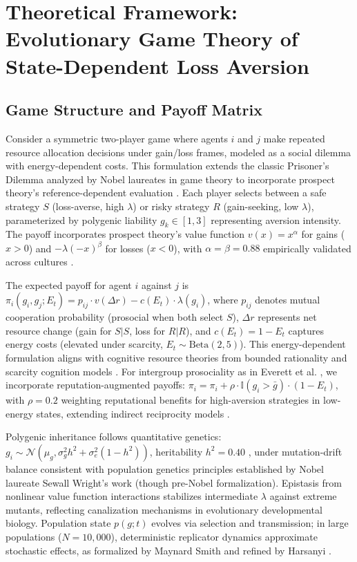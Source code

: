 \documentclass[11pt,twocolumn]{article}
\begin{document}
\section{Theoretical Framework: Evolutionary Game Theory of State-Dependent Loss Aversion}

\subsection{Game Structure and Payoff Matrix}

Consider a symmetric two-player game where agents $i$ and $j$ make repeated resource allocation decisions under gain/loss frames, modeled as a social dilemma with energy-dependent costs. This formulation extends the classic Prisoner's Dilemma analyzed by Nobel laureates in game theory \citep{axelrod1984,aumann2003} to incorporate prospect theory's reference-dependent evaluation \citep{kahneman1979,tversky1992}. Each player selects between a safe strategy $S$ (loss-averse, high $\lambda$) or risky strategy $R$ (gain-seeking, low $\lambda$), parameterized by polygenic liability $g_k \in [1, 3]$ representing aversion intensity. The payoff incorporates prospect theory's value function $v(x) = x^\alpha$ for gains ($x>0$) and $-\lambda (-x)^\beta$ for losses ($x<0$), with $\alpha=\beta=0.88$ empirically validated across cultures \citep{tversky1992,ruggeri2020}.

The expected payoff for agent $i$ against $j$ is $\pi_i(g_i, g_j; E_t) = p_{ij} \cdot v(\Delta r) - c(E_t) \cdot \lambda(g_i)$, where $p_{ij}$ denotes mutual cooperation probability (prosocial when both select $S$), $\Delta r$ represents net resource change (gain for $S|S$, loss for $R|R$), and $c(E_t) = 1 - E_t$ captures energy costs (elevated under scarcity, $E_t \sim \text{Beta}(2,5)$). This energy-dependent formulation aligns with cognitive resource theories from bounded rationality \citep{simon1957} and scarcity cognition models \citep{mani2013}. For intergroup prosociality as in Everett et al. \citep{everett2015}, we incorporate reputation-augmented payoffs: $\pi_i = \pi_i + \rho \cdot \mathbb{I}(g_i > \bar{g}) \cdot (1 - E_t)$, with $\rho=0.2$ weighting reputational benefits for high-aversion strategies in low-energy states, extending indirect reciprocity models \citep{nowak2006}.

Polygenic inheritance follows quantitative genetics: $g_i \sim \mathcal{N}(\mu_g, \sigma_g^2 h^2 + \sigma_e^2 (1-h^2))$, heritability $h^2=0.40$ \citep{polderman2015}, under mutation-drift balance consistent with population genetics principles established by Nobel laureate Sewall Wright's work (though pre-Nobel formalization). Epistasis from nonlinear value function interactions stabilizes intermediate $\lambda$ against extreme mutants, reflecting canalization mechanisms in evolutionary developmental biology. Population state $p(g; t)$ evolves via selection and transmission; in large populations ($N=10,000$), deterministic replicator dynamics approximate stochastic effects, as formalized by Maynard Smith \citep{smith1982} and refined by Harsanyi \citep{harsanyi1967}.
\end{document}
